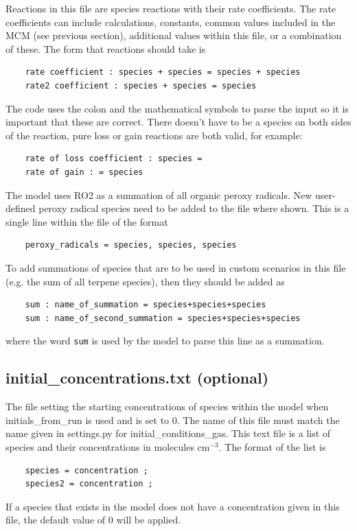 \documentclass[a4paper]{refart}
\begin{document}
Reactions in this file are species reactions with their rate coefficients. The rate coefficients can include calculations, constants, common values included in the MCM (see previous section), additional values within this file, or a combination of these. The form that reactions should take is
\begin{verbatim}
    rate coefficient : species + species = species + species
    rate2 coefficient : species + species = species
\end{verbatim}
The code uses the colon and the mathematical symbols to parse the input so it is important that these are correct. There doesn't have to be a species on both sides of the reaction, pure loss or gain reactions are both valid, for example:
\begin{verbatim}
    rate of loss coefficient : species = 
    rate of gain : = species
\end{verbatim}

The model uses RO2 as a summation of all organic peroxy radicals. New user-defined peroxy radical species need to be added to the file where shown. This is a single line within the file of the format
\begin{verbatim}
    peroxy_radicals = species, species, species
\end{verbatim}

To add summations of species that are to be used in custom scenarios in this file (e.g. the sum of all terpene species), then they should be added as
\begin{verbatim}
    sum : name_of_summation = species+species+species
    sum : name_of_second_summation = species+species+species
\end{verbatim}
where the word \texttt{sum} is used by the model to parse this line as a summation.

\subsection{initial\_concentrations.txt (optional)}\label{initial_concentrations.txt}
The file setting the starting concentrations of species within the model when initials\_from\_run is used and is set to 0. The name of this file must match the name given in settings.py for initial\_conditions\_gas. This text file is a list of species and their concentrations in molecules cm$^{-3}$. The format of the list is
\begin{verbatim}
    species = concentration ;
    species2 = concentration ;
\end{verbatim}
If a species that exists in the model does not have a concentration given in this file, the default value of 0 will be applied. 
\end{document}
